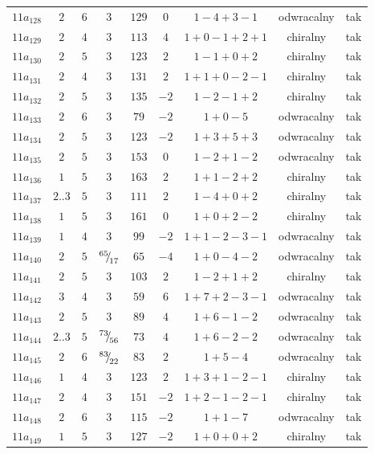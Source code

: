 \begin{longtable}{ccccccccc}
$11a_{128}$ & $2$ & $6$ & $3$ & $129$ & $0$ & $1-4+3-1$ & odwracalny & tak \\
$11a_{129}$ & $2$ & $4$ & $3$ & $113$ & $4$ & $1+0-1+2+1$ & chiralny & tak \\
$11a_{130}$ & $2$ & $5$ & $3$ & $123$ & $2$ & $1-1+0+2$ & chiralny & tak \\
$11a_{131}$ & $2$ & $4$ & $3$ & $131$ & $2$ & $1+1+0-2-1$ & chiralny & tak \\
$11a_{132}$ & $2$ & $5$ & $3$ & $135$ & $-2$ & $1-2-1+2$ & chiralny & tak \\
$11a_{133}$ & $2$ & $6$ & $3$ & $79$ & $-2$ & $1+0-5$ & odwracalny & tak \\
$11a_{134}$ & $2$ & $5$ & $3$ & $123$ & $-2$ & $1+3+5+3$ & odwracalny & tak \\
$11a_{135}$ & $2$ & $5$ & $3$ & $153$ & $0$ & $1-2+1-2$ & odwracalny & tak \\
$11a_{136}$ & $1$ & $5$ & $3$ & $163$ & $2$ & $1+1-2+2$ & chiralny & tak \\
$11a_{137}$ & $2..3$ & $5$ & $3$ & $111$ & $2$ & $1-4+0+2$ & chiralny & tak \\
$11a_{138}$ & $1$ & $5$ & $3$ & $161$ & $0$ & $1+0+2-2$ & chiralny & tak \\
$11a_{139}$ & $1$ & $4$ & $3$ & $99$ & $-2$ & $1+1-2-3-1$ & odwracalny & tak \\
$11a_{140}$ & $2$ & $5$ & ${}^{65}{\mskip -5mu/\mskip -3mu}_{17}$ & $65$ & $-4$ & $1+0-4-2$ & odwracalny & tak \\
$11a_{141}$ & $2$ & $5$ & $3$ & $103$ & $2$ & $1-2+1+2$ & chiralny & tak \\
$11a_{142}$ & $3$ & $4$ & $3$ & $59$ & $6$ & $1+7+2-3-1$ & odwracalny & tak \\
$11a_{143}$ & $2$ & $5$ & $3$ & $89$ & $4$ & $1+6-1-2$ & odwracalny & tak \\
$11a_{144}$ & $2..3$ & $5$ & ${}^{73}{\mskip -5mu/\mskip -3mu}_{56}$ & $73$ & $4$ & $1+6-2-2$ & odwracalny & tak \\
$11a_{145}$ & $2$ & $6$ & ${}^{83}{\mskip -5mu/\mskip -3mu}_{22}$ & $83$ & $2$ & $1+5-4$ & odwracalny & tak \\
$11a_{146}$ & $1$ & $4$ & $3$ & $123$ & $2$ & $1+3+1-2-1$ & chiralny & tak \\
$11a_{147}$ & $2$ & $4$ & $3$ & $151$ & $-2$ & $1+2-1-2-1$ & chiralny & tak \\
$11a_{148}$ & $2$ & $6$ & $3$ & $115$ & $-2$ & $1+1-7$ & odwracalny & tak \\
$11a_{149}$ & $1$ & $5$ & $3$ & $127$ & $-2$ & $1+0+0+2$ & chiralny & tak \\

\end{longtable}
